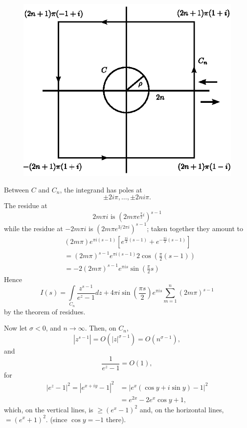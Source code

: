 \begin{figure}[H]
\centering
\includegraphics{figures/fig11.1.eps}
\end{figure}

Between $C$ and $C_n$, the integrand has poles at 
$$
\pm 2i \pi, \ldots, \pm 2 n i \pi. 
$$
The residue at 
$$2m\pi i \mbox{ is } (2 m \pi e^{\frac{\pi}{2} i})^{s-1}$$ 
while the residue at $-2m\pi i$ is $(2m\pi e^{3/2 \pi i})^{s-1}$; taken together
they amount to
\begin{align*}
& (2m \pi) e^{\pi i (s-1)} \left[e^{\frac{\pi i}{2} (s-1)} +
    e^{-\frac{\pi i}{2}(s-1)} \right]  \\
& = (2m\pi)^{s-1} e^{\pi i (s-1)} 2 \cos \left(\frac{\pi}{2} (s-1)\right)\\
& = -2 (2m \pi)^{s-1} e^{\pi i s} \sin \left(\frac{\pi}{2} s\right) 
\end{align*}
Hence\pageoriginale
$$
I(s) = \int\limits_{C_n} \frac{z^{s-1}}{e^z-1}dz + 4 \pi i \sin
\left(\frac{\pi s}{2}\right) e^{\pi i s} \sum\limits^n_{m=1} (2m \pi)^{s-1}
$$
by the theorem of residues.

Now let $\sigma <0$, and $n \to \infty$. Then, on $C_n$,
$$
|z^{s-1}| = O (|z|^{\sigma-1}) = O(n^{\sigma-1}),
$$
and
$$
\frac{1}{e^z-1} = O(1),
$$
for
\begin{align*}
|e^z-1|^2 = |e^{x+iy} -1|^2 & =  |e^x (\cos y + i \sin y )-1|^2\\
& = e^{2x} - 2 e^x \cos y + 1,
\end{align*}
which, on the vertical lines, is $ \geq (e^x -1)^2$ and, on the
horizontal lines, $=(e^x +1)^2$. (since $\cos  y = -1$ there).

